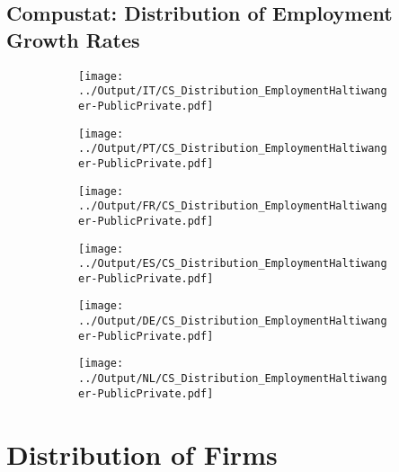 \documentclass[12pt,notitlepage]{article}
\begin{document}
\clearpage


\subsection{Compustat: Distribution of Employment Growth Rates}
\begin{figure}[!htpb]
\centering
\begin{subfigure}{.49\textwidth}
    \centering
 \texttt{[image: ../Output/IT/CS\_Distribution\_EmploymentHaltiwanger-PublicPrivate.pdf]}
\end{subfigure}%
\begin{subfigure}{.49\textwidth}
    \centering
 \texttt{[image: ../Output/PT/CS\_Distribution\_EmploymentHaltiwanger-PublicPrivate.pdf]}
\end{subfigure}
\begin{subfigure}{.49\textwidth}
    \centering
 \texttt{[image: ../Output/FR/CS\_Distribution\_EmploymentHaltiwanger-PublicPrivate.pdf]}
\end{subfigure}%
\begin{subfigure}{.49\textwidth}
    \centering
 \texttt{[image: ../Output/ES/CS\_Distribution\_EmploymentHaltiwanger-PublicPrivate.pdf]}
\end{subfigure}
\begin{subfigure}{.49\textwidth}
    \centering
 \texttt{[image: ../Output/DE/CS\_Distribution\_EmploymentHaltiwanger-PublicPrivate.pdf]}
\end{subfigure}
\begin{subfigure}{.49\textwidth}
    \centering
 \texttt{[image: ../Output/NL/CS\_Distribution\_EmploymentHaltiwanger-PublicPrivate.pdf]}
\end{subfigure}
\end{figure}

\clearpage

\FloatBarrier
\section{Distribution of Firms} %
\label{sec:distribution-of-firms}
\FloatBarrier
\end{document}
